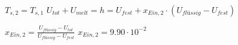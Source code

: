 \( T_{s,2} = T_{s,1} \)  
\( U_{tot} + U_{melt} = h = U_{fest} + x_{Ein,2} \cdot (U_{flüssig} - U_{fest}) \)  

\( x_{Ein,2} = \frac{U_{flüssig} - U_{tot}}{U_{flüssig} - U_{fest}} \)  
\( x_{Ein,2} = 9.90 \cdot 10^{-2} \)